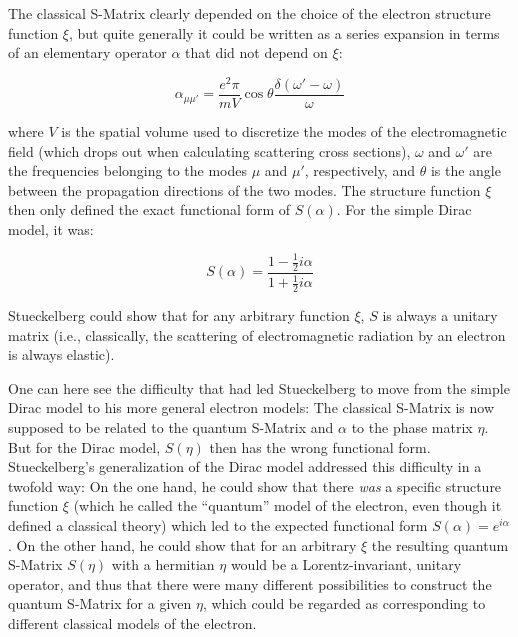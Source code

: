 \documentclass[12pt,a4paper]{article}
\begin{document}
The classical S-Matrix clearly depended on the choice of the electron structure function $\xi$, but quite generally it could be written as a series expansion in terms of an elementary operator $\alpha$ that did not depend on $\xi$:

\begin{equation}
\alpha_{\mu \mu'} = \frac{e^2 \pi}{m V}  \cos{\theta} \frac{\delta(\omega'-\omega)}{\omega}
\end{equation}

where $V$ is the spatial volume used to discretize the modes of the electromagnetic field (which drops out when calculating scattering cross sections), $\omega$ and $\omega'$ are the frequencies belonging to the modes $\mu$ and $\mu'$, respectively, and $\theta$ is the angle between the propagation directions of the two modes. The structure function $\xi$ then only defined the exact functional form of $S(\alpha)$. For the simple Dirac model, it was:

\begin{equation}
\label{eq:heitler}
S(\alpha) = \frac{1- \frac{1}{2} i \alpha}{1+ \frac{1}{2} i \alpha}
\end{equation}

Stueckelberg could show that for any arbitrary function $\xi$, $S$ is always a unitary matrix (i.e., classically, the scattering of electromagnetic radiation by an electron is always elastic).

One can here see the difficulty that had led Stueckelberg to move from the simple Dirac model to his more general electron models: The classical S-Matrix is now supposed to be related to the quantum S-Matrix and $\alpha$ to the phase matrix $\eta$. But for the Dirac model, $S(\eta)$ then has the wrong functional form. Stueckelberg's generalization of the Dirac model addressed this difficulty in a twofold way: On the one hand, he could show that there \emph{was} a specific structure function $\xi$ (which he called the ``quantum'' model of the electron, even though it defined a classical theory) which led to the expected functional form $S(\alpha) = e^{i \alpha}$. On the other hand, he could show that for an arbitrary $\xi$ the resulting quantum S-Matrix $S(\eta)$ with a hermitian $\eta$ would be a Lorentz-invariant, unitary operator, and thus that there were many different possibilities to construct the quantum S-Matrix for a given $\eta$, which could be regarded as corresponding to different classical models of the electron.
\end{document}
